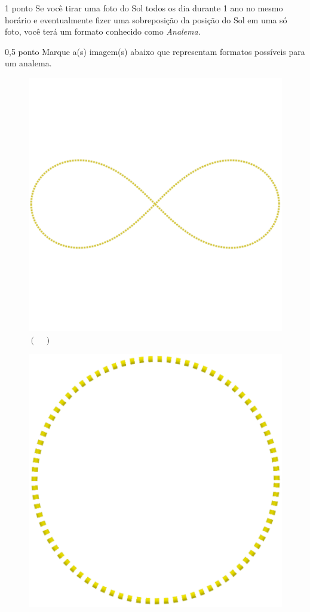 \documentclass{../lista}
\begin{document}
	\begin{questao}{1 ponto}
		Se você tirar uma foto do Sol todos os dia durante 1 ano no mesmo horário e eventualmente fizer uma sobreposição da posição do Sol em uma só foto, você terá um formato conhecido como \textit{Analema}.

		\begin{pergunta}{0,5 ponto}
			Marque a(s) imagem(s) abaixo que representam formatos possíveis para um analema.
			\begin{multicols}{2}
				\begin{figure}[H]
					\centering
					\includegraphics[scale=0.15]{./img/5a}
					\captionsetup{labelformat=empty}
					\caption{$(\quad)$}
				\end{figure}
				\begin{figure}[H]
					\centering
					\includegraphics[scale=0.15]{./img/5b}

\end{figure}
\end{multicols}
\end{pergunta}
\end{questao}
\end{document}

